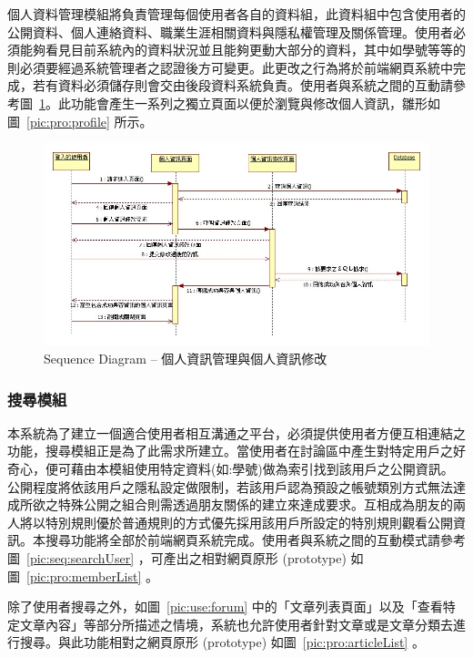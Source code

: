 個人資料管理模組將負責管理每個使用者各自的資料組，此資料組中包含使用者的公開資料、個人連絡資料、職業生涯相關資料與隱私權管理及關係管理。使用者必須能夠看見目前系統內的資料狀況並且能夠更動大部分的資料，其中如學號等等的則必須要經過系統管理者之認證後方可變更。此更改之行為將於前端網頁系統中完成，若有資料必須儲存則會交由後段資料系統負責。使用者與系統之間的互動請參考圖~\ref{pic:seq:profileMgt}。此功能會產生一系列之獨立頁面以便於瀏覽與修改個人資訊，雛形如圖~\ref{pic:pro:profile} 所示。

\begin{figure}[H]
\centering
\includegraphics[width=\textwidth]{img/useseq/stage1/seqProfileEdit.jpg}
\caption{Sequence Diagram -- 個人資訊管理與個人資訊修改}
\label{pic:seq:profileMgt}
\end{figure}

\subsubsection{搜尋模組}
本系統為了建立一個適合使用者相互溝通之平台，必須提供使用者方便互相連結之功能，搜尋模組正是為了此需求所建立。當使用者在討論區中產生對特定用戶之好奇心，便可藉由本模組使用特定資料(如:學號)做為索引找到該用戶之公開資訊。公開程度將依該用戶之隱私設定做限制，若該用戶認為預設之帳號類別方式無法達成所欲之特殊公開之組合則需透過朋友關係的建立來達成要求。互相成為朋友的兩人將以特別規則優於普通規則的方式優先採用該用戶所設定的特別規則觀看公開資訊。本搜尋功能將全部於前端網頁系統完成。使用者與系統之間的互動模式請參考圖~\ref{pic:seq:searchUser} ，可產出之相對網頁原形 (prototype) 如圖~\ref{pic:pro:memberList} 。

除了使用者搜尋之外，如圖~\ref{pic:use:forum} 中的「文章列表頁面」以及「查看特定文章內容」等部分所描述之情境，系統也允許使用者針對文章或是文章分類去進行搜尋。與此功能相對之網頁原形 (prototype) 如圖~\ref{pic:pro:articleList} 。

